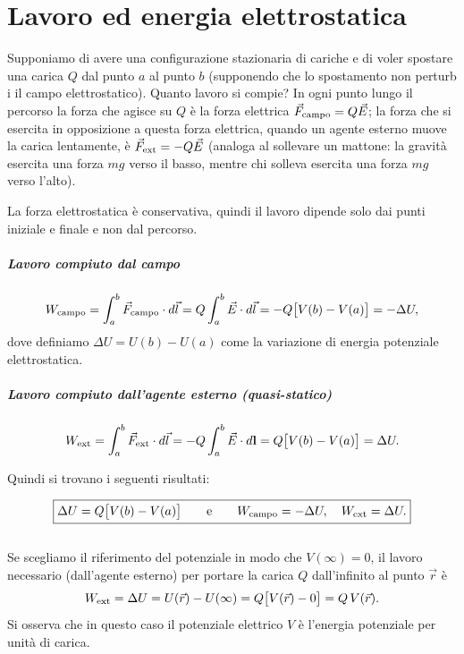 \documentclass{book}
\begin{document}
\chapter{Lavoro ed energia elettrostatica}

Supponiamo di avere una configurazione stazionaria di cariche e di voler spostare una carica \(Q\) dal punto \(a\) al punto \(b\) (supponendo che lo spostamento non perturb i il campo elettrostatico). Quanto lavoro si compie? In ogni punto lungo il percorso la forza che agisce su \(Q\) è la forza elettrica \(\vec{F}_{\rm campo}=Q\vec{E}\); la forza che si esercita in opposizione a questa forza elettrica, quando un agente esterno muove la carica lentamente, è \(\vec{F}_{\rm ext}=-Q\vec{E}\) (analoga al sollevare un mattone: la gravità esercita una forza \(mg\) verso il basso, mentre chi solleva esercita una forza \(mg\) verso l'alto).

La forza elettrostatica è conservativa, quindi il lavoro dipende solo dai punti iniziale e finale e non dal percorso.

\paragraph{Lavoro compiuto dal campo}
\[
W_{\rm campo}=\int_{a}^{b}\vec{F}_{\rm campo}\cdot d\vec{l}
=Q\int_{a}^{b}\vec{E}\cdot d\vec{l}
=-Q\bigl[V(b)-V(a)\bigr]
= -\Delta U,
\]
dove definiamo \(\Delta U=U(b)-U(a)\) come la variazione di energia potenziale elettrostatica.

\paragraph{Lavoro compiuto dall'agente esterno (quasi-statico)} 
\[
W_{\rm ext}=\int_{a}^{b}\vec{F}_{\rm ext}\cdot d\vec{l}
=-Q\int_{a}^{b}\vec{E}\cdot d\mathbf{l}
=Q\bigl[V(b)-V(a)\bigr]=\Delta U.
\]

Quindi si trovano i seguenti risultati:

\[
\boxed{\Delta U = Q\bigl[V(b)-V(a)\bigr] \qquad\text{e}\qquad
W_{\rm campo}=-\Delta U,\quad W_{\rm ext}=\Delta U.}
\]
\\
Se scegliamo il riferimento del potenziale in modo che \(V(\infty)=0\), il lavoro necessario (dall'agente esterno) per portare la carica \(Q\)
dall'infinito al punto \(\vec{r}\) è
\[
W_{\rm ext} = \Delta U = U(\vec{r})-U(\infty)=Q\bigl[V(\vec{r})-0\bigr]=Q\,V(\vec{r}).
\]
Si osserva che in questo caso il potenziale elettrico \(V\) è l'energia potenziale per unità di carica.
\end{document}
